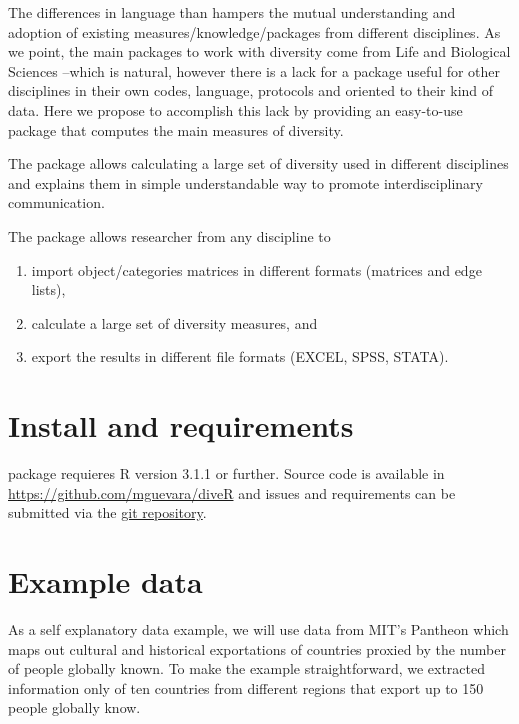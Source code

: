 The differences in language than hampers the mutual understanding and adoption of existing measures/knowledge/packages from different disciplines. As we point, the main packages to work with diversity come from Life and Biological Sciences --which is natural, however there is a lack for a package useful for other disciplines in their own codes, language, protocols and oriented to their kind of data. Here we propose to accomplish this lack by providing an easy-to-use package that computes the main measures of diversity.


The  package allows calculating a large set of diversity used in different disciplines and explains them in simple understandable way to promote interdisciplinary communication.

The  package allows researcher from any discipline to 
\begin{enumerate}
  \item import object/categories matrices in different formats (matrices and edge lists), 
  \item calculate a large set of diversity measures, and 
  \item export the results in different file formats (EXCEL, SPSS, STATA). 
\end{enumerate}




\section{Install and requirements}
 package requieres R version 3.1.1 or further. 
Source code is available in \url{https://github.com/mguevara/diveR} and issues and requirements can be submitted via the \href{https://github.com/mguevara/diveR/issues}{git repository}.

\section{Example data}
As a self explanatory data example, we will use data from MIT's Pantheon which maps out cultural and historical exportations of countries proxied by the number of people globally known\citep{macroconnections_mit_medialab_pantheon_2014}. To make the example straightforward, we extracted information only of ten countries from different regions that export up to 150 people globally know.

